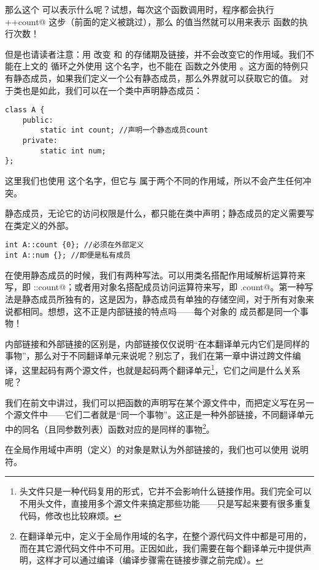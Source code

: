 那么这个 \lstinline@count@ 可以表示什么呢？试想，每次这个函数调用时，程序都会执行 \lstinline@++count@ 这步（前面的定义被跳过），那么 \lstinline@count@ 的值当然就可以用来表示 \lstinline@func@ 函数的执行次数！\par
但是也请读者注意：用 \lstinline@static@ 改变 \lstinline@x@ 和 \lstinline@count@ 的存储期及链接，并不会改变它的作用域。我们不能在上文的 \lstinline@for@ 循环之外使用 \lstinline@x@ 这个名字，也不能在 \lstinline@func@ 函数之外使用 \lstinline@count@。这方面的特例只有静态成员，如果我们定义一个公有静态成员，那么外界就可以获取它的值。
对于类也是如此，我们可以在一个类中声明静态成员：
\begin{lstlisting}
class A {
    public:
        static int count; //声明一个静态成员count
    private:
        static int num;
};
\end{lstlisting}
这里我们也使用 \lstinline@count@ 这个名字，但它与 \lstinline@func@ 属于两个不同的作用域，所以不会产生任何冲突。\par
静态成员，无论它的访问权限是什么，都只能在类中声明；静态成员的定义需要写在类定义的外部。
\begin{lstlisting}
int A::count {0}; //必须在外部定义
int A::num {}; //即便是私有成员
\end{lstlisting}
在使用静态成员的时候，我们有两种写法。可以用类名搭配作用域解析运算符来写，即 \lstinline@A::count@；或者用对象名搭配成员访问运算符来写，即 \lstinline@a.count@。第一种写法是静态成员所独有的，这是因为，静态成员有单独的存储空间，对于所有对象来说都相同。想想，这不正是内部链接的特点吗——每个对象的 \lstinline@count@ 成员都是同一个事物！\par
内部链接和外部链接的区别是，内部链接仅仅说明``在本翻译单元内它们是同样的事物''，那么对于不同翻译单元来说呢？别忘了，我们在第一章中讲过跨文件编译，这里起码有两个源文件，也就是起码两个翻译单元\footnote{头文件只是一种代码复用的形式，它并不会影响什么链接作用。我们完全可以不用头文件，直接用多个源文件来搞定那些功能——只是写起来要有很多重复代码，修改也比较麻烦。}，它们之间是什么关系呢？\par
我们在前文中讲过，我们可以把函数的声明写在某个源文件中，而把定义写在另一个源文件中——它们二者就是``同一个事物''。这正是一种外部链接，不同翻译单元中的同名（且同参数列表）函数对应的是同样的事物\footnote{在翻译单元中，定义于全局作用域的名字，在整个源代码文件中都是可用的，而在其它源代码文件中不可用。正因如此，我们需要在每个翻译单元中提供声明，这样才可以通过编译（编译步骤需在链接步骤之前完成）。}。\par
在全局作用域中声明（定义）的对象是默认为外部链接的，我们也可以使用 \lstinline@extern@ 说明符。
